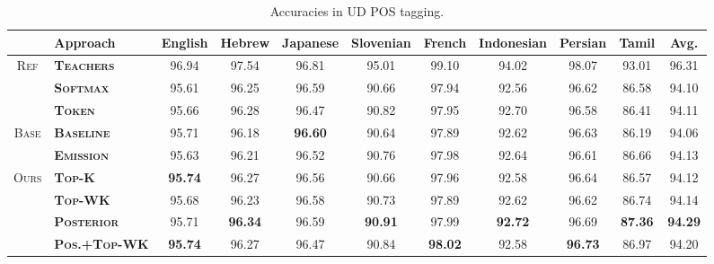 \documentclass[11pt,a4paper]{article}
\begin{document}
\begin{table*}[t!]
\centering
\setlength\tabcolsep{2.5pt}
\small
\begin{tabular}{c|l|cccccccc|c}
\hline\hline
 & \bf Approach & \bf English    & \bf Hebrew    & \bf Japanese    & \bf Slovenian  & \bf French    & \bf Indonesian    & \bf Persian    & \bf Tamil    & \bf Avg.  \\
\hline
\multirow{3}{*}{\textsc{Ref}} & \bf \textsc{Teachers}           & 96.94 & 97.54 & 96.81 & 95.01 & 99.10 & 94.02 & 98.07 & 93.01 & 96.31 \\
&\bf \textsc{\textsc{Softmax}} & 95.61 & 96.25 & 96.59 & 90.66 & 97.94 & 92.56 & 96.62 & 86.58 & 94.10 \\
& \bf \textsc{Token} & 95.66 & 96.28 & 96.47 & 90.82 & 97.95 & 92.70 & 96.58 & 86.41 & 94.11 \\
\hline
\multirow{2}{*}{\textsc{Base}}&\bf \textsc{Baseline}               & 95.71 & 96.18 & \textbf{96.60} & 90.64 & 97.89 & 92.62 & 96.63 & 86.19 & 94.06 \\
& \bf \textsc{Emission}            & 95.63 & 96.21 & 96.52 & 90.76 & 97.98 & 92.64 & 96.61 & 86.66 & 94.13 \\
\hline
\multirow{4}{*}{\textsc{Ours}}&\bf \textsc{Top-K}                   & \textbf{95.74} & 96.27 & 96.56 & 90.66 & 97.96 & 92.58 & 96.64 & 86.57 & 94.12 \\
& \bf \textsc{Top-WK}      & 95.68 & 96.23 & 96.58 & 90.73 & 97.89 & 92.62 & 96.62 & 86.74 & 94.14 \\
& \bf \textsc{Posterior}              & 95.71 & \textbf{96.34} & 96.59 & \textbf{90.91} & 97.99 & \textbf{92.72} & 96.69 & \textbf{87.36} & \textbf{94.29} \\
& \bf \textsc{Pos.+Top-WK} & \textbf{95.74} & 96.27 & 96.47 & 90.84 & \textbf{98.02} & 92.58 & \textbf{96.73} & 86.97  & 94.20 \\
\hline\hline
\end{tabular}
\caption{Accuracies in UD POS tagging.}
\label{tab:upos}
\end{table*}
\end{document}
